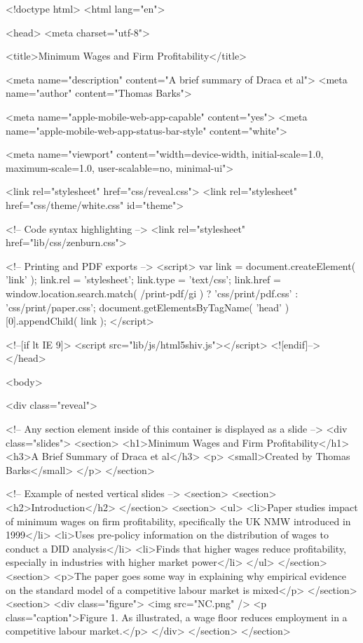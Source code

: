 <!doctype html>
<html lang="en">

	<head>
		<meta charset="utf-8">

		<title>Minimum Wages and Firm Profitability</title>

		<meta name="description" content="A brief summary of Draca et al">
		<meta name="author" content="Thomas Barks">

		<meta name="apple-mobile-web-app-capable" content="yes">
		<meta name="apple-mobile-web-app-status-bar-style" content="white">

		<meta name="viewport" content="width=device-width, initial-scale=1.0, maximum-scale=1.0, user-scalable=no, minimal-ui">

		<link rel="stylesheet" href="css/reveal.css">
		<link rel="stylesheet" href="css/theme/white.css" id="theme">

		<!-- Code syntax highlighting -->
		<link rel="stylesheet" href="lib/css/zenburn.css">

		<!-- Printing and PDF exports -->
		<script>
			var link = document.createElement( 'link' );
			link.rel = 'stylesheet';
			link.type = 'text/css';
			link.href = window.location.search.match( /print-pdf/gi ) ? 'css/print/pdf.css' : 'css/print/paper.css';
			document.getElementsByTagName( 'head' )[0].appendChild( link );
		</script>

		<!--[if lt IE 9]>
		<script src="lib/js/html5shiv.js"></script>
		<![endif]-->
	</head>

	<body>

		<div class="reveal">

			<!-- Any section element inside of this container is displayed as a slide -->
			<div class="slides">
				<section>
					<h1>Minimum Wages and Firm Profitability</h1>
					<h3>A Brief Summary of Draca et al</h3>
					<p>
						<small>Created by Thomas Barks</small>
					</p>
				</section>

				<!-- Example of nested vertical slides -->
				<section>
					<section>
						<h2>Introduction</h2>
					</section>
					<section>
						<ul>
							<li>Paper studies impact of minimum wages on firm profitability, specifically the UK NMW introduced in 1999</li>
							<li>Uses pre-policy information on the distribution of wages to conduct a DID analysis</li>
							<li>Finds that higher wages reduce profitability, especially in industries with higher market power</li>
						</ul>
					</section>
					<section>
						<p>The paper goes some way in explaining why empirical evidence on the standard model of a competitive labour market is mixed</p>
					</section>
			        <section>   
			             <div class="figure">
			             	<img src="NC.png" />
			             	<p class="caption">Figure 1. As illustrated, a wage floor reduces employment in a competitive labour market.</p>
			             </div>
			        </section>
				</section>

